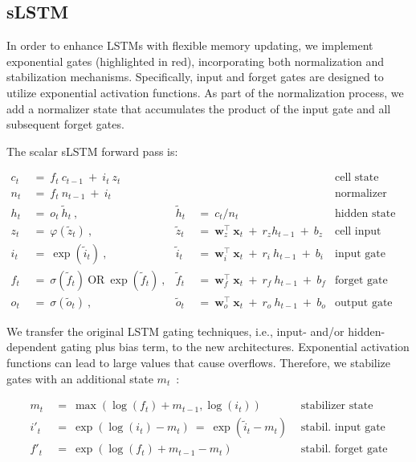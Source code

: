 \subsection{sLSTM}
\label{sec:sLSTM}

In order to enhance LSTMs with flexible memory updating, we implement exponential gates (highlighted in red), incorporating both normalization and stabilization mechanisms. Specifically, input and forget gates are designed to utilize exponential activation functions. As part of the normalization process, we add a normalizer state that accumulates the product of the input gate and all subsequent forget gates.

The scalar sLSTM forward pass is:

\begin{align}
\label{eq:slstmforward}
c_t \ &= \  f_t \ c_{t-1} \ + \ i_t \ z_t & & 
 &\text{cell state} \\
n_t \ &= \  f_t \ n_{t-1} \ + \ i_t  & & 
 &\text{normalizer state} \\
h_t \ &= \ o_t \ \tilde{h}_t \ ,
  &\tilde{h}_t \ &= \ c_t / n_t
&\text{hidden state} \\
z_t \ &= \ \varphi \left( \tilde{z}_t \right) \ , 
  &\tilde{z}_t \ &=  \ \mathbf{w}^\top_{z} \ \mathbf{x}_t \ + \
  r_{z}  h_{t-1} \ + \  b_{z}
  &\text{cell input} \\
i_t \ &= \ \!\exp \left( \tilde{i}_t  \right) \ , 
  &\tilde{i}_t \ &= \ \mathbf{w}^\top_{i} \ \mathbf{x}_t \ + \
  r_{i}  \ h_{t-1} \ + \  b_{i}
  &\text{input gate} \\
f_t \ &= \ \sigma \left(  \tilde{f}_t \right) \ \text{OR} \
\!\exp \left(  \tilde{f}_t \right) \ ,
  &\tilde{f}_t \ &= \ \mathbf{w}^\top_{f} \ \mathbf{x}_t  \ + \
  r_{f}  \ h_{t-1} \ + \  b_{f}
  &\text{forget gate} \\
o_t \ &= \ \sigma \left( \tilde{o}_t \right) \ , 
  &\tilde{o}_t  \ &= \ \mathbf{w}^\top_{o} \ \mathbf{x}_t \ + \
  r_{o}  \ h_{t-1} \ + \  b_{o}
  &\text{output gate} 
\end{align}

We transfer the original LSTM gating techniques, i.e., input- and/or hidden-dependent gating plus bias term, to the new architectures. Exponential activation functions can lead to large values that cause overflows. Therefore, we stabilize gates with an additional state \mbox{$m_t$~\citep{Milakov:18arxiv}}:

\begin{align}
\label{eq:slstmstabil}
m_t \ &= \ \max \left( \log ( f_t ) + m_{t-1} , \log ( i_t ) \right) &\text{stabilizer state} \\
i'_t \ &= \ \!\exp \left( \log \left ( i_t \right) - m_t \right) \ = \ \!\exp \left( \tilde{i}_t - m_t \right) \ \, 
  &\text{stabil. input gate} \\
f'_t \ &= \ \!\exp \left( \log \left( f_t \right) + m_{t-1} - m_t \right) \ \, 
  &\text{stabil. forget gate}
\end{align}

